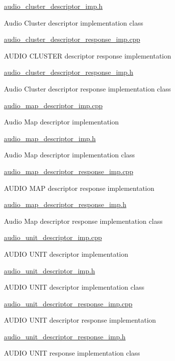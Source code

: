 \hyperlink{audio__cluster__descriptor__imp_8h}{audio\+\_\+cluster\+\_\+descriptor\+\_\+imp.\+h}

Audio Cluster descriptor implementation class

\hyperlink{audio__cluster__descriptor__response__imp_8cpp}{audio\+\_\+cluster\+\_\+descriptor\+\_\+response\+\_\+imp.\+cpp}

A\+U\+D\+IO C\+L\+U\+S\+T\+ER descriptor response implementation

\hyperlink{audio__cluster__descriptor__response__imp_8h}{audio\+\_\+cluster\+\_\+descriptor\+\_\+response\+\_\+imp.\+h}

Audio Cluster descriptor response implementation class

\hyperlink{audio__map__descriptor__imp_8cpp}{audio\+\_\+map\+\_\+descriptor\+\_\+imp.\+cpp}

Audio Map descriptor implementation

\hyperlink{audio__map__descriptor__imp_8h}{audio\+\_\+map\+\_\+descriptor\+\_\+imp.\+h}

Audio Map descriptor implementation class

\hyperlink{audio__map__descriptor__response__imp_8cpp}{audio\+\_\+map\+\_\+descriptor\+\_\+response\+\_\+imp.\+cpp}

A\+U\+D\+IO M\+AP descriptor response implementation

\hyperlink{audio__map__descriptor__response__imp_8h}{audio\+\_\+map\+\_\+descriptor\+\_\+response\+\_\+imp.\+h}

Audio Map descriptor response implementation class

\hyperlink{audio__unit__descriptor__imp_8cpp}{audio\+\_\+unit\+\_\+descriptor\+\_\+imp.\+cpp}

A\+U\+D\+IO U\+N\+IT descriptor implementation

\hyperlink{audio__unit__descriptor__imp_8h}{audio\+\_\+unit\+\_\+descriptor\+\_\+imp.\+h}

A\+U\+D\+IO U\+N\+IT descriptor implementation class

\hyperlink{audio__unit__descriptor__response__imp_8cpp}{audio\+\_\+unit\+\_\+descriptor\+\_\+response\+\_\+imp.\+cpp}

A\+U\+D\+IO U\+N\+IT descriptor response implementation

\hyperlink{audio__unit__descriptor__response__imp_8h}{audio\+\_\+unit\+\_\+descriptor\+\_\+response\+\_\+imp.\+h}

A\+U\+D\+IO U\+N\+IT response implementation class

